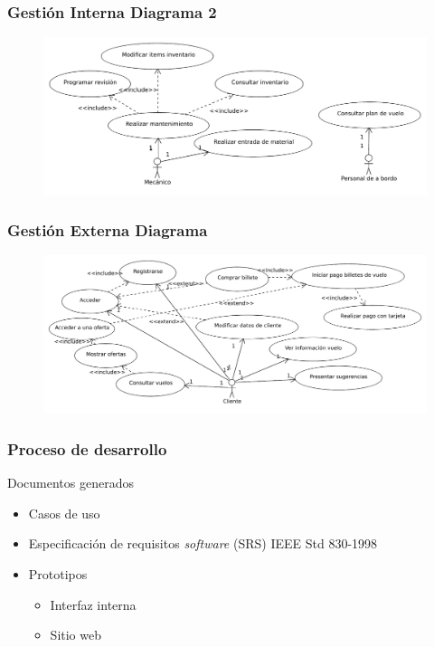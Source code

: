\documentclass{beamer}
\newcommand{\software}{\textit{software }}
\begin{document}
\begin{frame}
	\frametitle{Gestión Interna \scriptsize{Diagrama 2}}

	\begin{figure}
		\hspace*{-.3cm}\includegraphics[scale=.5]{gestioninterna2.pdf}
	\end{figure}
\end{frame}

\begin{frame}
	\frametitle{Gestión Externa \scriptsize{Diagrama}}

	\begin{figure}
		\hspace*{-.2cm}\includegraphics[scale=.46]{gestionexterna.pdf}
	\end{figure}
\end{frame}

\begin{frame}
	\frametitle{Proceso de desarrollo}

	\begin{block}{Documentos generados}
	\begin{itemize}
		\item Casos de uso \pause
		\item Especificación de requisitos \software (SRS) {\scriptsize IEEE Std 830-1998} \pause
		\item Prototipos
			\begin{itemize}
				\item Interfaz interna
				\item Sitio web
			\end{itemize}
	\end{itemize}
	\end{block}
\end{frame}
\end{document}
